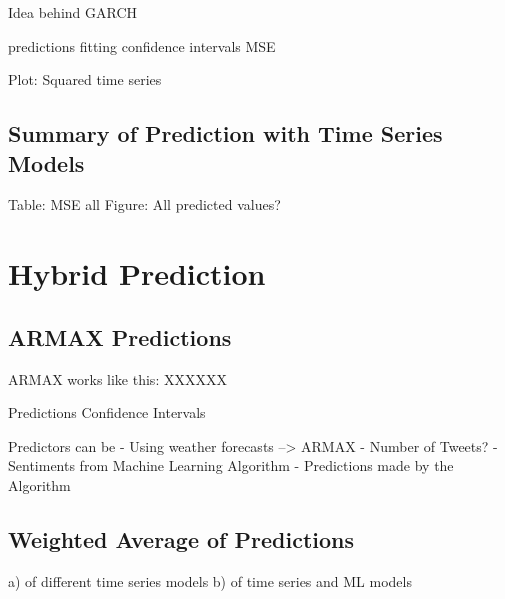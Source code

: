 Idea behind GARCH

predictions
fitting
confidence intervals
MSE

Plot: Squared time series



\subsection{Summary of Prediction with Time Series Models}
Table: MSE all
Figure: All predicted values?


\section{Hybrid Prediction}

\subsection{ARMAX Predictions}
ARMAX works like this: 
XXXXXX

Predictions
Confidence Intervals


Predictors can be 
- Using weather forecasts --> ARMAX
- Number of Tweets?
- Sentiments from Machine Learning Algorithm
- Predictions made by the Algorithm



\subsection{Weighted Average of Predictions}
a) of different time series models
b) of time series and ML models